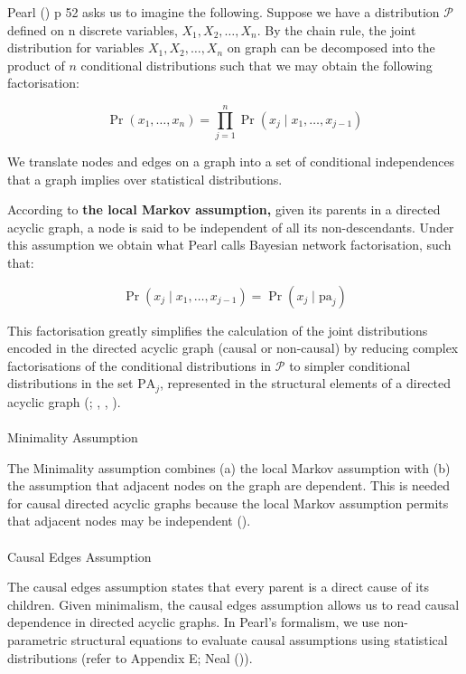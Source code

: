 \documentclass[
  single column]{article}
\makeatletter
\let\oldparagraph\paragraph
\renewcommand{\paragraph}{
    \@ifstar
      \xxxParagraphStar
      \xxxParagraphNoStar
  }
\newcommand{\xxxParagraphStar}[1]{\oldparagraph*{#1}\mbox{}}
\newcommand{\xxxParagraphNoStar}[1]{\oldparagraph{#1}\mbox{}}
\makeatother
\begin{document}
Pearl () p 52 asks us to imagine the
following. Suppose we have a distribution \(\mathcal{P}\) defined on n
discrete variables, \(X_1, X_2,  \dots, X_n\). By the chain rule, the
joint distribution for variables \(X_1, X_2, \dots, X_n\) on graph can
be decomposed into the product of \(n\) conditional distributions such
that we may obtain the following factorisation:

\[
\Pr(x_1, \dots, x_n) = \prod_{j=1}^n \Pr(x_j \mid x_1, \dots, x_{j-1})
\]

We translate nodes and edges on a graph into a set of conditional
independences that a graph implies over statistical distributions.

According to \textbf{the local Markov assumption,} given its parents in
a directed acyclic graph, a node is said to be independent of all its
non-descendants. Under this assumption we obtain what Pearl calls
Bayesian network factorisation, such that:

\[
\Pr(x_j \mid x_1, \dots, x_{j-1}) = \Pr(x_j \mid \text{pa}_j)
\]

This factorisation greatly simplifies the calculation of the joint
distributions encoded in the directed acyclic graph (causal or
non-causal) by reducing complex factorisations of the conditional
distributions in \(\mathcal{P}\) to simpler conditional distributions in
the set \(\text{PA}_j\), represented in the structural elements of a
directed acyclic graph (; ,
, ).

\paragraph{Minimality Assumption}\label{minimality-assumption}

The Minimality assumption combines (a) the local Markov assumption with
(b) the assumption that adjacent nodes on the graph are dependent. This
is needed for causal directed acyclic graphs because the local Markov
assumption permits that adjacent nodes may be independent
().

\paragraph{Causal Edges Assumption}\label{causal-edges-assumption}

The causal edges assumption states that every parent is a direct cause
of its children. Given minimalism, the causal edges assumption allows us
to read causal dependence in directed acyclic graphs. In Pearl's
formalism, we use non-parametric structural equations to evaluate causal
assumptions using statistical distributions (refer to Appendix E; Neal
()).
\end{document}
